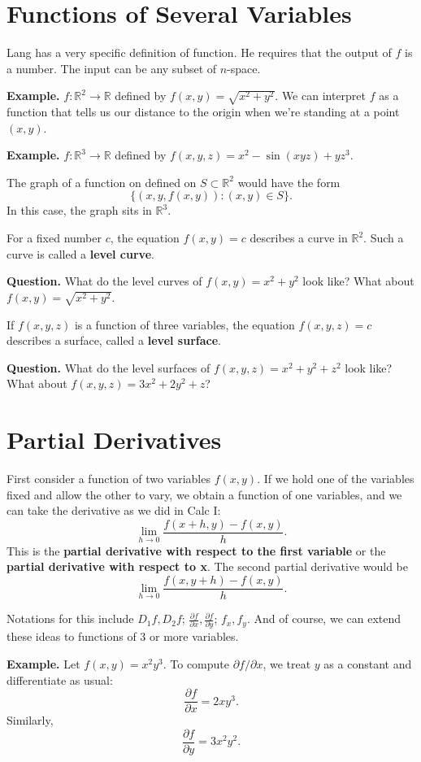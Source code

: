 \documentclass{article}
\begin{document}




\section*{Functions of Several Variables}

Lang has a very specific definition of function. He requires that 
the output of $f$ is a number. The input can be any subset of $n$-space.


\textbf{Example.} $f: \mathbb{R}^2 \rightarrow \mathbb{R}$ defined by
$f(x,y)=\sqrt{x^2+y^2}$. We can interpret $f$ as a function that 
tells us our distance to the origin when we're standing at a point
$(x,y)$.

\textbf{Example.} $f: \mathbb{R}^3 \rightarrow \mathbb{R}$ defined 
by $f(x,y,z) = x^2 - \sin(xyz) + yz^3$.

The graph of a function on defined on $S\subset \mathbb{R}^2$ would have the form
\[ \{ (x,y,f(x,y)) : (x,y) \in S\}.\]
In this case, the graph sits in $\mathbb{R}^3$.

For a fixed number $c$, the equation $f(x,y)=c$ describes a curve
in $\mathbb{R}^2$. Such a curve is called a \textbf{level curve}.

\textbf{Question.} What do the level curves of $f(x,y) = x^2 + y^2$ look like? What about $f(x,y) = \sqrt{x^2+y^2}$.


If $f(x,y,z)$ is a function of three variables, the equation $f(x,y,z)=c$
describes a surface, called a \textbf{level surface}.

\textbf{Question.} What do the level surfaces of $f(x,y,z) = x^2 + y^2 + z^2$ look like?
What about $f(x,y,z) = 3x^2 + 2y^2 + z$?


\section*{Partial Derivatives}

First consider a function of two variables $f(x,y)$. If we hold one of the variables
fixed and allow the other to vary, we obtain a function of one variables, and we
can take the derivative as we did in Calc I:
\[\lim_{h \to 0} \frac{f(x+h,y)-f(x,y)}{h}.\]
This is the \textbf{partial derivative with respect to the first variable} or the 
\textbf{partial derivative with respect to x}. The second partial derivative would be 
\[\lim_{h \to 0} \frac{f(x,y+h)-f(x,y)}{h}.\]

Notations for this include $D_1 f, D_2 f$; $\frac{\partial f}{\partial x}, \frac{\partial f}{\partial y}$; $f_x, f_y$. 
And of course, we can extend these ideas to functions of $3$ or more variables.

\textbf{Example.} Let $f(x,y) = x^2 y^3$. To compute $\partial f / \partial x$, we treat $y$ as a constant
and differentiate as usual:
\[\frac{\partial f}{\partial x} = 2xy^3.\]
Similarly, 
\[\frac{\partial f}{\partial y} = 3x^2y^2.\]
\end{document}
